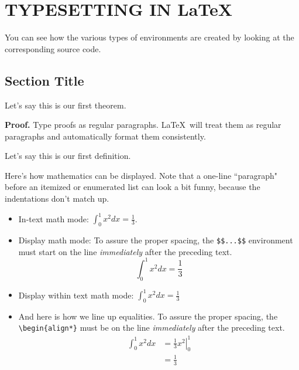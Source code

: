 \chapter{TYPESETTING IN \LaTeX }\label{chap2:latex}


You can see how the various types of environments are created by looking at the corresponding source code.


\section{Section Title}

\begin{theorem}
	\label{th1}
	Let's say this is our first theorem.
\end{theorem}

{\bf Proof.}
Type proofs as regular paragraphs. \LaTeX \ will treat them as regular paragraphs and automatically format them consistently.

\begin{definition}
	\label{def1}	
	Let's say this is our first definition.
\end{definition}

Here's how mathematics can be displayed.
Note that a one-line ``paragraph" before an itemized or enumerated list can look a bit funny, because the indentations don't match up.

\begin{itemize}
	\item
	In-text math mode: $\int _0 ^1 x^2 dx = {\frac{1}{3}}$.
	
	\item
	Display  math mode:
	To assure the proper spacing, the \verb+$$...$$+ environment must start on the line \emph{immediately} after the preceding text.
	$$\int _0 ^1 x^2 dx = {\frac{1}{3}}$$
	
	\item
	Display within text math mode: 
	$\displaystyle{ \int _0 ^1 x^2 dx = \frac{1}{3} } $
	
	\item
	And here is how we line up equalities.
	To assure the proper spacing, the \verb+\begin{align*}+ must be on the line \emph{immediately} after the preceding text.
	\begin{align*}
		\int _0 ^1 x^2 dx
		& = \left. {\frac{1}{3}} x^2 \right| _{0} ^1 \\
		& = {\frac{1}{3}}
	\end{align*}

\end{itemize}

